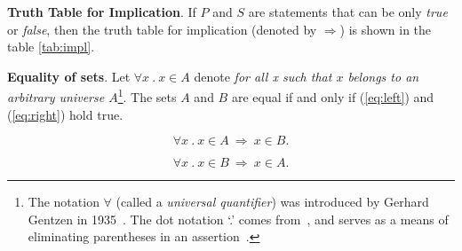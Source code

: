 \documentclass{llncs}
\begin{document}
\begin{definition}\label{def:implies} {\bf Truth Table for Implication}. \rm If $P$ and $S$ are statements that can be only \textit{true} or \textit{false}, then the truth table for implication (denoted by $\Rightarrow$) is shown in the table \ref{tab:impl}.

\vspace{-2mm}

\begin{table}[htbp]
\caption{Truth table for implication}
\centering
{}\label{tab:impl}
\end{table}
\end{definition}

\vspace{-6mm}

\begin{definition} {\bf Equality of sets}. \rm Let $\forall x~.~x \in A$ denote {\it for all x such that $x$ belongs to an arbitrary universe $A$}\footnote{The notation $\forall$ (called a {\it universal quantifier}) was introduced by Gerhard Gentzen in 1935~\cite{Gentzen35}.  The dot notation `.' comes from~\cite{Russell13}, and serves as a means of eliminating parentheses in an assertion~\cite{Quine51}.}. The sets $A$ and $B$ are equal if and only if (\ref{eq:left}) and (\ref{eq:right}) hold true.

\vspace{-3mm}

\begin{equation}\label{eq:left}
\forall x~.~x \in A\ \Rightarrow\ x\in B .
\end{equation}

\vspace{-5mm}

\begin{equation}\label{eq:right}
\forall x~.~x \in B\ \Rightarrow\ x\in A .
\end{equation}\label{def:eq}
\end{definition}
\end{document}
